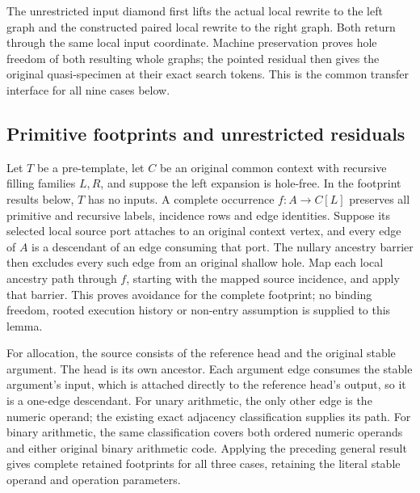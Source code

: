 The unrestricted input diamond first lifts the actual local rewrite to the
left graph and the constructed paired local rewrite to the right graph.
Both return through the same local input coordinate. Machine preservation
proves hole freedom of both resulting whole graphs; the pointed residual
then gives the original quasi-specimen at their exact search tokens.
This is the common transfer interface for all nine cases below.
\subsection{Primitive footprints and unrestricted residuals}
Let $T$ be a pre-template, let $C$ be an original common context with
recursive filling families $L,R$, and suppose the left expansion is
hole-free. In the footprint results below, $T$ has no inputs. A complete
occurrence $f:A\to C[L]$ preserves all primitive and recursive labels,
incidence rows and edge identities. Suppose its selected local source
port attaches to an original context vertex, and every edge of $A$ is a
descendant of an edge consuming that port. The nullary ancestry barrier
then excludes every such edge from an original shallow hole. Map each
local ancestry path through $f$, starting with the mapped source incidence,
and apply that barrier. This proves avoidance for the complete footprint;
no binding freedom, rooted execution history or non-entry assumption is
supplied to this lemma.

\par{}


For allocation, the source consists of the reference head and the original
stable argument. The head is its own ancestor. Each argument edge consumes
the stable argument's input, which is attached directly to the reference
head's output, so it is a one-edge descendant. For unary arithmetic, the
only other edge is the numeric operand; the existing exact adjacency
classification supplies its path. For binary arithmetic, the same
classification covers both ordered numeric operands and either original
binary arithmetic code. Applying the preceding general result gives
complete retained footprints for all three cases, retaining the literal
stable operand and operation parameters.

\par{}


